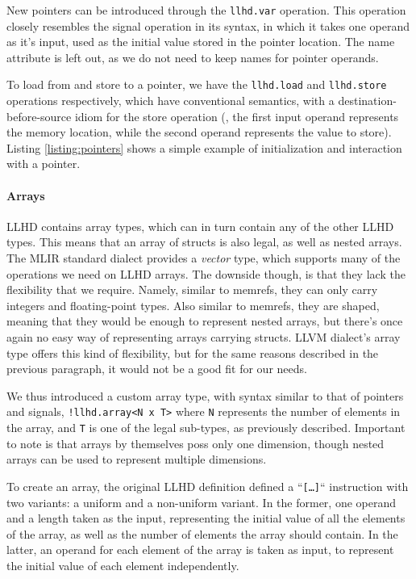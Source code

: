 New pointers can be introduced through the \texttt{llhd.var} operation. This operation closely resembles the signal operation in its syntax, in which it takes one operand as it's input, used as the initial value stored in the pointer location. The name attribute is left out, as we do not need to keep names for pointer operands.

To load from and store to a pointer, we have the \texttt{llhd.load} and \texttt{llhd.store} operations respectively, which have conventional semantics, with a destination-before-source idiom for the store operation (\ie, the first input operand represents the memory location, while the second operand represents the value to store). Listing \ref{listing:pointers} shows a simple example of initialization and interaction with a pointer.


\paragraph{Arrays}
LLHD contains array types, which can in turn contain any of the other LLHD types. This means that an array of structs is also legal, as well as nested arrays. The MLIR standard dialect provides a \textit{vector} type, which supports many of the operations we need on LLHD arrays. The downside though, is that they lack the flexibility that we require. Namely, similar to memrefs, they can only carry integers and floating-point types. Also similar to memrefs, they are shaped, meaning that they would be enough to represent nested arrays, but there's once again no easy way of representing arrays carrying structs. LLVM dialect's array type offers this kind of flexibility, but for the same reasons described in the previous paragraph, it would not be a good fit for our needs.

We thus introduced a custom array type, with syntax similar to that of pointers and signals, \ie \texttt{!llhd.array<N x T>} where  \texttt{N} represents the number of elements in the array, and \texttt{T} is one of the legal sub-types, as previously described. Important to note is that arrays by themselves poss only one dimension, though nested arrays can be used to represent multiple dimensions.

To create an array, the original LLHD definition defined a “\texttt{[\ldots]}“ instruction with two variants: a uniform and a non-uniform variant. In the former, one operand and a length taken as the input, representing the initial value of all the elements of the array, as well as the number of elements the array should contain. In the latter, an operand for each element of the array is taken as input, to represent the initial value of each element independently.


